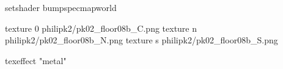 setshader bumpspecmapworld

texture 0 philipk2/pk02_floor08b_C.png
texture n philipk2/pk02_floor08b_N.png
texture s philipk2/pk02_floor08b_S.png

texeffect "metal"
